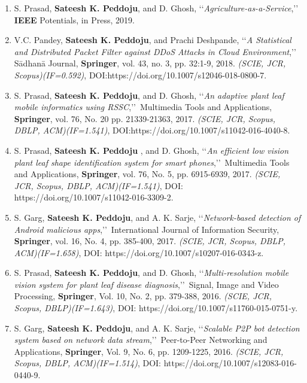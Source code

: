 \begin{enumerate}%
	\item
	S. Prasad, \textbf{Sateesh K. Peddoju}, and D. Ghosh, \lq\lq \textit{Agriculture-as-a-Service},\rq\rq\, {\textbf{IEEE} Potentials}, in Press, 2019. 
	
	\item
	V.C. Pandey, \textbf{Sateesh K. Peddoju}, and Prachi Deshpande, \lq\lq \textit{A Statistical and Distributed Packet Filter against DDoS Attacks in Cloud Environment},\rq\rq\, S{\={a}}dhan{\={a}} Journal, \textbf{Springer}, vol. 43, no. 3, pp. 32:1-9, 2018. \emph{(SCIE, JCR, Scopus)(IF=0.592)}, DOI:https://doi.org/10.1007/s12046-018-0800-7. 
	
	\item
	S. Prasad, \textbf{Sateesh K. Peddoju}, and D. Ghosh, \lq\lq \textit{An adaptive plant leaf mobile informatics using RSSC},\rq\rq\, Multimedia Tools and Applications, \textbf{Springer}, vol. 76, No. 20 pp. 21339-21363, 2017. \emph{(SCIE, JCR, Scopus, DBLP, ACM)(IF=1.541)}, DOI:https://doi.org/10.1007/s11042-016-4040-8.
	
	\item
	S. Prasad, \textbf{Sateesh K. Peddoju} , and D. Ghosh, \lq\lq \textit{An efficient low vision plant leaf shape identification system for smart phones},\rq\rq\, Multimedia Tools and Applications, \textbf{Springer}, vol. 76, No. 5, pp. 6915-6939, 2017. \emph{(SCIE, JCR, Scopus, DBLP, ACM)(IF=1.541)}, DOI: https://doi.org/10.1007/s11042-016-3309-2.
	
	\item
	S. Garg, \textbf{Sateesh K. Peddoju}, and A. K. Sarje, \lq\lq \textit{Network-based detection of Android malicious apps},\rq\rq\, International Journal of Information Security, \textbf{Springer}, vol. 16, No. 4, pp. 385-400, 2017. \emph{(SCIE, JCR, Scopus, DBLP, ACM)(IF=1.658)}, DOI: https://doi.org/10.1007/s10207-016-0343-z.
	
	\item
	S. Prasad, \textbf{Sateesh K. Peddoju}, and D. Ghosh, \lq\lq \textit{Multi-resolution mobile vision system for plant leaf disease diagnosis},\rq\rq\, Signal, Image and Video Processing, \textbf{Springer}, Vol. 10, No. 2, pp. 379-388, 2016. \emph{(SCIE, JCR,  Scopus, DBLP)(IF=1.643)}, DOI: https://doi.org/10.1007/s11760-015-0751-y.
	
	\item
	S. Garg, \textbf{Sateesh K. Peddoju}, and A. K. Sarje, \lq\lq \textit{Scalable P2P bot detection system based on network data stream},\rq\rq\, Peer-to-Peer Networking and Applications, \textbf{Springer}, Vol. 9, No. 6, pp. 1209-1225, 2016. \emph{(SCIE, JCR, Scopus, DBLP, ACM)(IF=1.514)}, DOI: https://doi.org/10.1007/s12083-016-0440-9.
	

\end{enumerate}
